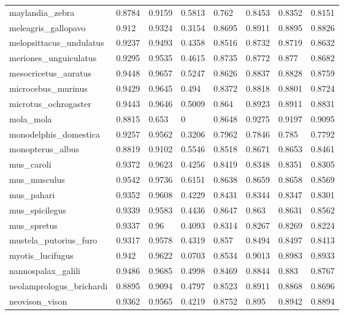 \documentclass{article}
\begin{document}
\begin{table}[!h]
{\begin{tabular}{@{}llllllll@{}}
maylandia\_zebra & 0.8784 & 0.9159 & 0.5813 & 0.762 & 0.8453 & 0.8352 & 0.8151 \\
meleagris\_gallopavo & 0.912 & 0.9324 & 0.3154 & 0.8695 & 0.8911 & 0.8895 & 0.8826 \\
melopsittacus\_undulatus & 0.9237 & 0.9493 & 0.4358 & 0.8516 & 0.8732 & 0.8719 & 0.8632 \\
meriones\_unguiculatus & 0.9295 & 0.9535 & 0.4615 & 0.8735 & 0.8772 & 0.877 & 0.8682 \\
mesocricetus\_auratus & 0.9448 & 0.9657 & 0.5247 & 0.8626 & 0.8837 & 0.8828 & 0.8759 \\
microcebus\_murinus & 0.9429 & 0.9645 & 0.494 & 0.8372 & 0.8818 & 0.8801 & 0.8724 \\
microtus\_ochrogaster & 0.9443 & 0.9646 & 0.5009 & 0.864 & 0.8923 & 0.8911 & 0.8831 \\
mola\_mola & 0.8815 & 0.653 & 0 & 0.8648 & 0.9275 & 0.9197 & 0.9095 \\
monodelphis\_domestica & 0.9257 & 0.9562 & 0.3206 & 0.7962 & 0.7846 & 0.785 & 0.7792 \\
monopterus\_albus & 0.8819 & 0.9102 & 0.5546 & 0.8518 & 0.8671 & 0.8653 & 0.8461 \\
mus\_caroli & 0.9372 & 0.9623 & 0.4256 & 0.8419 & 0.8348 & 0.8351 & 0.8305 \\
mus\_musculus & 0.9542 & 0.9736 & 0.6151 & 0.8638 & 0.8659 & 0.8658 & 0.8569 \\
mus\_pahari & 0.9352 & 0.9608 & 0.4229 & 0.8431 & 0.8344 & 0.8347 & 0.8301 \\
mus\_spicilegus & 0.9339 & 0.9583 & 0.4436 & 0.8647 & 0.863 & 0.8631 & 0.8562 \\
mus\_spretus & 0.9337 & 0.96 & 0.4093 & 0.8314 & 0.8267 & 0.8269 & 0.8224 \\
mustela\_putorius\_furo & 0.9317 & 0.9578 & 0.4319 & 0.857 & 0.8494 & 0.8497 & 0.8413 \\
myotis\_lucifugus & 0.942 & 0.9622 & 0.0703 & 0.8534 & 0.9013 & 0.8983 & 0.8933 \\
nannospalax\_galili & 0.9486 & 0.9685 & 0.4998 & 0.8469 & 0.8844 & 0.883 & 0.8767 \\
neolamprologus\_brichardi & 0.8895 & 0.9094 & 0.4797 & 0.8523 & 0.8911 & 0.8868 & 0.8696 \\
neovison\_vison & 0.9362 & 0.9565 & 0.4219 & 0.8752 & 0.895 & 0.8942 & 0.8894 \\
\hline
\end{tabular}}
\end{table}
\end{document}
